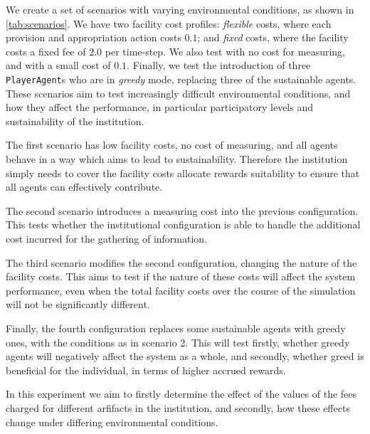 We create a set of scenarios with varying environmental conditions, as shown
in \autoref{tab:scenarios}. We have two facility cost profiles:
\emph{flexible} costs, where each provision and appropriation action costs
$0.1$; and \emph{fixed} costs, where the facility costs a fixed fee of $2.0$ per
time-step. We also test with no cost for measuring, and with a small cost of
$0.1$. Finally, we test the introduction of three \texttt{PlayerAgent}s who are in
\emph{greedy} mode, replacing three of the sustainable agents. These scenarios aim to test increasingly difficult environmental conditions, and how they affect the performance, in particular participatory levels and sustainability of the institution.

The first scenario has low facility costs, no cost of
measuring, and all agents behave in a way which aims to lead to
sustainability. Therefore the institution simply needs to cover the facility
costs allocate rewards suitability to ensure that all agents can effectively
contribute.

The second scenario introduces a measuring cost into the previous
configuration. This tests whether the institutional configuration is able to
handle the additional cost incurred for the gathering of information.

The third scenario modifies the second configuration, changing the nature of
the facility costs. This aims to test if the nature of these costs will affect
the system performance, even when the total facility costs over the course of
the simulation will not be significantly different.

Finally, the fourth configuration replaces some sustainable agents with greedy ones, with the conditions
as in scenario 2. This will test firstly, whether greedy agents will negatively
affect the system as a whole, and secondly, whether greed is beneficial for
the individual, in terms of higher accrued rewards.

In this experiment we aim to firstly determine the effect of the values of
the fees charged for different arfifacts in the institution, and secondly, how
these effects change under differing environmental conditions.



